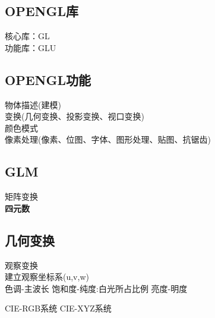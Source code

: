 \documentclass{article}
\begin{document}
\begin{CJK}{UTF8}{gbsn}
	\subsection{OPENGL库}
	核心库：GL\\
	功能库：GLU\\
	\subsection{OPENGL功能}
	物体描述(建模)\\
	变换(几何变换、投影变换、视口变换)\\
	颜色模式\\
	像素处理(像素、位图、字体、图形处理、贴图、抗锯齿)\\
	\subsection{GLM}
	矩阵变换\\
	\textbf{四元数}\\
	\subsection{几何变换}
	观察变换\\
	建立观察坐标系(u,v,w)\\
	
	
	色调-主波长
	饱和度-纯度:白光所占比例
	亮度-明度	
	
	CIE-RGB系统
	CIE-XYZ系统
\end{CJK}
\end{document}
